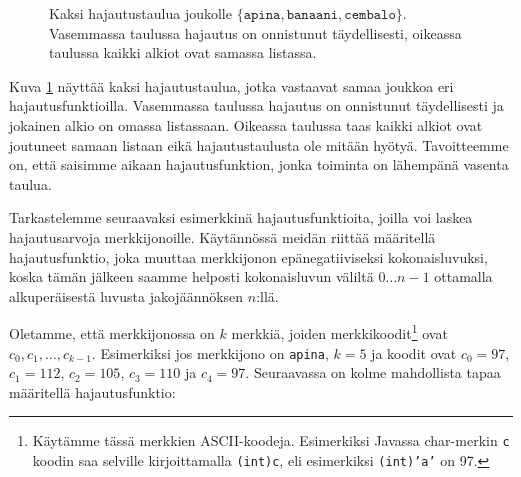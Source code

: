 \begin{figure}
\caption{Kaksi hajautustaulua joukolle $\{\texttt{apina},\texttt{banaani},\texttt{cembalo}\}$.
Vasemmassa taulussa hajautus on onnistunut täydellisesti,
oikeassa taulussa kaikki alkiot ovat samassa listassa.}
\label{fig:hajjak}
\end{figure}

Kuva \ref{fig:hajjak} näyttää kaksi hajautustaulua, jotka vastaavat
samaa joukkoa eri hajautusfunktioilla.
Vasemmassa taulussa hajautus on onnistunut täydellisesti
ja jokainen alkio on omassa listassaan.
Oikeassa taulussa taas kaikki alkiot ovat joutuneet samaan
listaan eikä hajautustaulusta ole mitään hyötyä.
Tavoitteemme on, että saisimme aikaan hajautusfunktion,
jonka toiminta on lähempänä vasenta taulua.

Tarkastelemme seuraavaksi esimerkkinä hajautusfunktioita,
joilla voi laskea hajautusarvoja merkkijonoille.
Käytännössä meidän riittää määritellä hajautusfunktio,
joka muuttaa merkkijonon epänegatiiviseksi kokonaisluvuksi,
koska tämän jälkeen saamme helposti kokonaisluvun
väliltä $0 \dots n-1$ ottamalla alkuperäisestä luvusta jakojäännöksen $n$:llä.

Oletamme, että merkkijonossa on $k$ merkkiä,
joiden merkkikoodit\footnote{Käytämme tässä merkkien ASCII-koodeja.
Esimerkiksi Javassa char-merkin \texttt{c} koodin saa
selville kirjoittamalla \texttt{(int)c}, eli esimerkiksi
\texttt{(int)'a'} on 97.} ovat $c_0,c_1,\dots,c_{k-1}$.
Esimerkiksi jos merkkijono on \texttt{apina},
$k=5$ ja koodit ovat $c_0=97$, $c_1=112$, $c_2=105$,
$c_3=110$ ja $c_4=97$.
Seuraavassa on kolme mahdollista tapaa määritellä hajautusfunktio:

